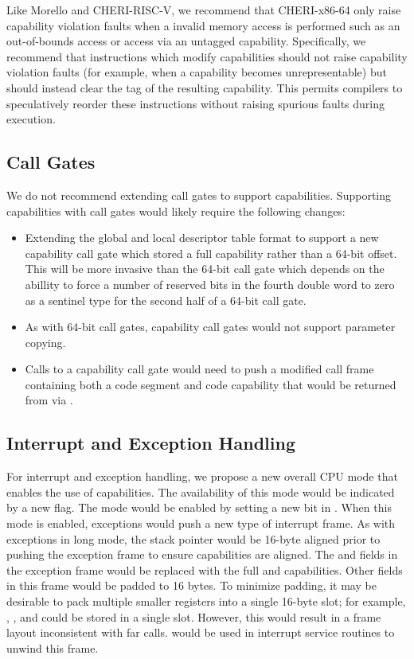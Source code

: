 Like Morello and CHERI-RISC-V, we recommend that CHERI-x86-64
only raise capability violation faults when a invalid memory access is
performed such as an out-of-bounds access or access via an untagged
capability.  Specifically, we recommend that instructions which modify
capabilities should not raise capability violation faults (for
example, when a capability becomes unrepresentable) but should instead
clear the tag of the resulting capability.  This permits compilers to
speculatively reorder these instructions without raising spurious
faults during execution.

\subsection{Call Gates}

We do not recommend extending call gates to support capabilities.
Supporting capabilities with call gates would likely require the
following changes:

\begin{itemize}
  \item Extending the global and local descriptor table format to
    support a new capability call gate which stored a full capability
    rather than a 64-bit offset.  This will be more invasive than the
    64-bit call gate which depends on the abillity to force a number
    of reserved bits in the fourth double word to zero as a sentinel
    type for the second half of a 64-bit call gate.

  \item As with 64-bit call gates, capability call gates would not support
    parameter copying.

  \item Calls to a capability call gate would need to push a modified
    call frame containing both a code segment and code capability that
    would be returned from via .
\end{itemize}

\subsection{Interrupt and Exception Handling}
\label{sec:x86:interrupt-exception}

For interrupt and exception handling, we propose a new overall CPU
mode that enables the use of capabilities.  The availability of this
mode would be indicated by a new  flag.  The mode
would be enabled by setting a new bit in \CRFOUR{}.  When this mode is
enabled, exceptions would push a new type of interrupt frame.  As with
exceptions in long mode, the stack pointer would be 16-byte aligned
prior to pushing the exception frame to ensure capabilities are
aligned.  The \RIP{} and \RSP{} fields in the exception frame would be
replaced with the full \CIP{} and \CSP{} capabilities.  Other fields
in this frame would be padded to 16 bytes.  To minimize padding, it
may be desirable to pack multiple smaller registers into a single
16-byte slot; for example, \SS{}, \CS{}, and \RFLAGS{} could be stored
in a single slot.  However, this would result in a frame layout
inconsistent with far calls.   would be used in
interrupt service routines to unwind this frame.

